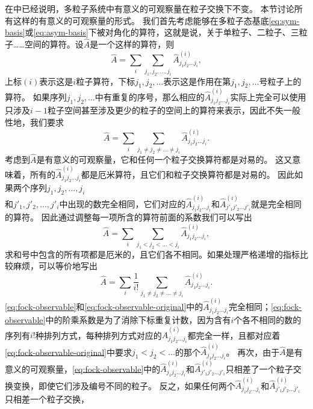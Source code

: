 \documentclass[hyperref, UTF8, a4paper]{ctexart}
\renewcommand{\autoref}{\prettyref}
\begin{document}
在\autoref{sec:n-particle-space}中已经说明，多粒子系统中有意义的可观察量在粒子交换下不变。
本节讨论所有这样的有意义的可观察量的形式。
我们首先考虑能够在多粒子态基底\eqref{eq:sym-basis}或\eqref{eq:asym-basis}下被对角化的算符，这就是说，关于单粒子、二粒子、三粒子……空间的算符。设$\hat{A}$是一个这样的算符，则
\[
    \hat{A} = \sum_i \sum_{j_1, j_2, \ldots, j_i} \hat{A}^{(i)}_{j_1 j_2 \ldots j_i},
\]
上标$(i)$表示这是$i$粒子算符，下标$j_1, j_2, \ldots$表示这是作用在第$j_1, j_2, \ldots$号粒子上的算符。
如果序列$j_1, j_2, \ldots$中有重复的序号，那么相应的$\hat{A}^{(i)}_{j_1 j_2 \ldots j_i}$实际上完全可以使用只涉及$i-1$粒子空间甚至涉及更少的粒子的空间上的算符来表示，因此不失一般性地，我们要求
\[
    \hat{A} = \sum_i \sum_{j_1 \neq j_2 \neq \ldots \neq j_i} \hat{A}^{(i)}_{j_1 j_2 \ldots j_i}.
\]
考虑到$\hat{A}$是有意义的可观察量，它和任何一个粒子交换算符都是对易的。
这又意味着，所有的$\hat{A}^{(i)}_{j_1 j_2 \ldots j_i}$都是厄米算符，且它们和粒子交换算符都是对易的。
因此如果两个序列$j_1, j_2, \ldots, j_i$ \\
和$j'_1, j'_2, \ldots, j'_i$中出现的数完全相同，它们对应的$\hat{A}^{(i)}_{j_1 j_2 \ldots j_i}$和$\hat{A}^{(i)}_{j'_1 j'_2 \ldots j'_i}$就是完全相同的算符。
因此通过调整每一项所含的算符前面的系数我们可以写出
\begin{equation}
    \hat{A} = \sum_i \sum_{j_1 < j_2 < \ldots < j_i} \hat{A}^{(i)}_{j_1 j_2 \ldots j_i},
    \label{eq:fock-observable-original}
\end{equation}
求和号中包含的所有项都是厄米的，且它们各不相同。如果处理严格递增的指标比较麻烦，可以等价地写出
\begin{equation}
    \hat{A} = \sum_i \frac{1}{i!} \sum_{j_1 \neq j_2 \neq \ldots \neq j_i} \hat{A}^{(i)}_{j_1 j_2 \ldots j_i}.
    \label{eq:fock-observable}
\end{equation}
\eqref{eq:fock-observable}和\eqref{eq:fock-observable-original}中的$\hat{A}^{(i)}_{j_1 j_2 \ldots j_i}$完全相同；\eqref{eq:fock-observable}中的阶乘系数是为了消除下标重复计数，因为含有$i$个各不相同的数的序列有$i!$种排列方式，每种排列方式对应的$\hat{A}^{(i)}_{j_1 j_2 \ldots j_i}$都完全一样，且都对应着\eqref{eq:fock-observable-original}中要求$j_1 < j_2 < \ldots$的那个$\hat{A}^{(i)}_{j_1 j_2 \ldots j_i}$。
再次，由于$\hat{A}$是有意义的可观察量，\eqref{eq:fock-observable}中的$\hat{A}^{(i)}_{j_1 j_2 \ldots j_i}$和$\hat{A}^{(i)}_{j'_1 j'_2 \ldots j'_i}$只相差了一个粒子交换变换，即使它们涉及编号不同的粒子。
反之，如果任何两个$\hat{A}^{(i)}_{j_1 j_2 \ldots j_i}$和$\hat{A}^{(i)}_{j'_1 j'_2 \ldots j'_i}$只相差一个粒子交换，%
\end{document}
